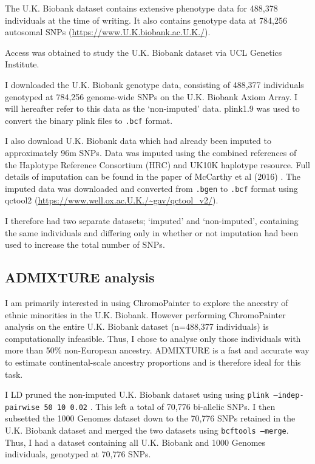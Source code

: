 The U.K. Biobank dataset contains extensive phenotype data for 488,378 individuals at the time of writing. It also contains genotype data at 784,256 autosomal SNPs (\url{https://www.U.K.biobank.ac.U.K./}).

Access was obtained to study the U.K. Biobank dataset via UCL Genetics Institute. 

I downloaded the U.K. Biobank genotype data, consisting of 488,377 individuals genotyped at 784,256 genome-wide SNPs on the U.K. Biobank Axiom Array. I will hereafter refer to this data as the `non-imputed' data. plink1.9 \cite{purcell2007plink} was used to convert the binary plink files to \texttt{.bcf} format. 


I also download U.K. Biobank data which had already been imputed to approximately 96m SNPs. Data was imputed using the combined references of the Haplotype Reference Consortium (HRC) and UK10K haplotype resource. Full details of imputation can be found in the paper of McCarthy et al (2016) \cite{mccarthy2016reference}. The imputed data was downloaded and converted from \texttt{.bgen} to \texttt{.bcf} format using qctool2 (\url{https://www.well.ox.ac.U.K./~gav/qctool_v2/}). 

I therefore had two separate datasets; `imputed' and `non-imputed', containing the same individuals and differing only in whether or not imputation had been used to increase the total number of SNPs.

\subsection{ADMIXTURE analysis}

I am primarily interested in using ChromoPainter \cite{Lawson2012} to explore the ancestry of ethnic minorities in the U.K. Biobank. However performing ChromoPainter analysis on the entire U.K. Biobank dataset (n=488,377 individuals) is computationally infeasible. Thus, I chose to analyse only those individuals with more than 50\% non-European ancestry. ADMIXTURE is a fast and accurate way to estimate continental-scale ancestry proportions \cite{alexander2009fast} and is therefore ideal for this task. 

I LD pruned the non-imputed U.K. Biobank dataset using using \texttt{plink --indep-pairwise 50 10 0.02} \cite{purcell2007plink}. This left a total of  70,776 bi-allelic SNPs. I then subsetted the 1000 Genomes dataset down to the 70,776 SNPs retained in the U.K. Biobank dataset and merged the two datasets using \texttt{bcftools --merge}. Thus, I had a dataset containing all U.K. Biobank and 1000 Genomes individuals, genotyped at 70,776 SNPs.

